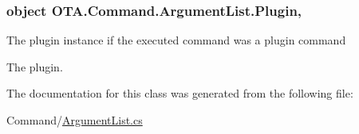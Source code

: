 \subsubsection[{Plugin}]{\setlength{\rightskip}{0pt plus 5cm}object O\+T\+A.\+Command.\+Argument\+List.\+Plugin\hspace{0.3cm}{\ttfamily [get]}, {\ttfamily [set]}}\label{class_o_t_a_1_1_command_1_1_argument_list_a3f1da304ea4e797daf3f20599b81f268}


The plugin instance if the executed command was a plugin command 

The plugin.

The documentation for this class was generated from the following file\+:\begin{DoxyCompactItemize}
\item 
Command/\hyperlink{_argument_list_8cs}{Argument\+List.\+cs}\end{DoxyCompactItemize}
